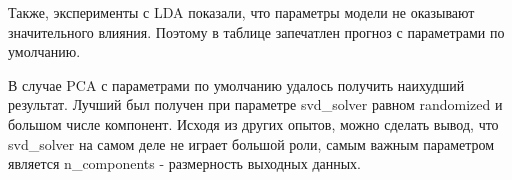 \documentclass[a4paper,12pt]{article}
\begin{document}
	\vspace{0.5cm}
	Также, эксперименты с LDA показали, что параметры модели не оказывают значительного влияния. Поэтому в таблице запечатлен прогноз с параметрами по умолчанию. 
	
	\vspace{0.5cm}
	В случае PCA с параметрами по умолчанию удалось получить наихудший результат. Лучший был получен при параметре svd\_solver равном randomized и большом числе компонент. Исходя из других опытов, можно сделать вывод, что svd\_solver на самом деле не играет большой роли, самым важным параметром является n\_components - размерность выходных данных.
	
	
\end{document}
